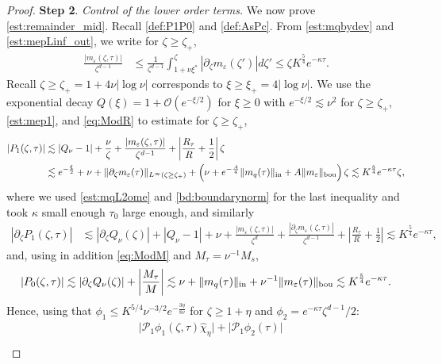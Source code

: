\documentclass[11pt]{aims}
\theoremstyle{definition}
\newcommand{\ep}{\varepsilon}
\newcommand{\Oc}{\mathcal{O}}
\newcommand{\Pc}{\mathcal{P}}
\newcommand{\pa}{\partial}
\newcommand{\inn}{\textup{in}}
\numberwithin{equation}{section}
\begin{document}
\begin{proof}
\noindent \textbf{Step 2}. \emph{Control of the lower order terms.} We now prove \eqref{est:remainder_mid}. Recall \eqref{def:P1P0} and \eqref{def:AsPc}. From \eqref{est:mqbydev} and \eqref{est:mepLinf_out}, we write for $\zeta  \geq \zeta_+$,
\begin{align}
\frac{|m_\ep(\zeta, \tau)|}{\zeta^{d-1}} &\leq \frac{1}{\zeta^{d-1}} \int_{1 + \nu \xi^*}^\zeta |\pa_\zeta m_\ep(\zeta')| d\zeta'  \leq \zeta K^{\frac 54}e^{-\kappa \tau}.\label{est:mep1}
\end{align}
Recall $\zeta\geq \zeta_+=1+4\nu |\log \nu|$ corresponds to $\xi \geq \xi_+=4|\log \nu|$. We  use the exponential decay $Q(\xi) = 1+\Oc(e^{-\xi/2})$ for $\xi \geq 0$ with $e^{-\xi/2}\lesssim \nu^{2}$ for $\zeta\geq \zeta_+$, \eqref{est:mep1}, and \eqref{eq:ModR} to estimate  for $ \zeta  \geq \zeta_+$, 
\begin{align*}
 |P_1(\zeta, \tau)| &\lesssim |Q_\nu - 1| +\frac \nu \zeta+ \frac{|m_\ep (\zeta, \tau)|}{\zeta^{d-1}} + \left|\frac{R_\tau}{R} + \frac{1}{2} \right|\zeta \\
& \lesssim e^{-\frac \xi2} + \nu   + \| \pa_\zeta m_\ep(\tau)\|_{L^\infty(\zeta\geq \zeta_+)} + \left( \nu+e^{-\frac A4}\|m_q(\tau)\|_\inn + A \| m_\varepsilon \|_{\textup{bou}}\right)\zeta \lesssim  K^\frac{5}{4} e^{-\kappa \tau}\zeta ,
\end{align*}  
where we used \eqref{est:mqL2ome} and \eqref{bd:boundarynorm} for the last inequality and took $\kappa $ small enough $\tau_0$ large enough, and similarly
\begin{align*}
|\pa_\zeta P_1(\zeta, \tau)| &\lesssim |\pa_\zeta Q_\nu (\zeta)|+|Q_\nu - 1|  + \nu + \frac{|m_\ep(\zeta, \tau)|}{\zeta^d}+ \frac{|\pa_\zeta m_\ep(\zeta, \tau)|}{\zeta^{d-1}} +\left|\frac{R_\tau}{R} + \frac{1}{2} \right|\lesssim K^\frac{5}4e^{-\kappa \tau},
\end{align*}
and, using in addition \eqref{eq:ModM} and $M_\tau=\nu^{-1}M_s$,
\begin{align*}
|P_0(\zeta, \tau)| \lesssim |\pa_\zeta Q_\nu (\zeta)| + \left|\frac{M_\tau}{M} \right| \lesssim \nu + \|m_q(\tau)\|_\inn+\nu^{-1}\| m_\ep(\tau)\|_{\textup{bou}} \lesssim K^\frac{5}4e^{-\kappa \tau}.
\end{align*}
Hence, using that $\phi_1\leq K^{5/4}\nu^{-3/2} e^{-\frac{3\eta}{8\nu}}$ for $\zeta\geq 1+\eta$ and $\phi_2=e^{-\kappa \tau}\zeta^{d-1}/2$:
\begin{align}
\nonumber & \big|\Pc_1 \phi_1(\zeta, \tau) \hat \chi_{\eta} \big| +\big|\Pc_1 \phi_2(\tau) \big|  \\

\end{align}
\end{proof}
\end{document}
